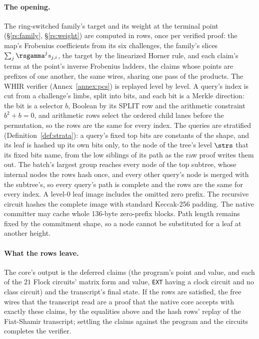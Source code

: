 \paragraph{The opening.} The ring-switched family's target and its weight at the terminal point (\S\ref{rs:family}, \S\ref{rs:weight}) are computed in rows, once per verified proof: the map's Frobenius coefficients from its six challenges, the family's slices $\sum_j\rsgamma^j s_{j,i}$, the target by the linearized Horner rule, and each claim's terms at the point's inverse Frobenius ladders, the claims whose points are prefixes of one another, the same wires, sharing one pass of the products. The WHIR verifier (Annex~\ref{annex:pcs}) is replayed level by level. A query's index is cut from a challenge's limbs, split into bits, and each bit is a Merkle direction: the bit is a selector $b$, Boolean by its \textsf{SPLIT} row and the arithmetic constraint $b^2+b=0$, and arithmetic rows select the ordered child lanes before the permutation, so the rows are the same for every index. The queries are stratified (Definition~\ref{def:strata}): a query's fixed top bits are constants of the shape, and its leaf is hashed up its own bits only, to the node of the tree's level $\strs$ that its fixed bits name, from the low siblings of its path as the raw proof writes them out. The batch's largest group reaches every node of the top subtree, whose internal nodes the rows hash once, and every other query's node is merged with the subtree's, so every query's path is complete and the rows are the same for every index. A level-$0$ leaf image includes the omitted zero prefix. The recursive circuit hashes the complete image with standard Keccak-256 padding. The native committer may cache whole 136-byte zero-prefix blocks. Path length remains fixed by the commitment shape, so a node cannot be substituted for a leaf at another height.

\paragraph{What the rows leave.} The core's output is the deferred claims (the program's point and value, and each of the $21$ Flock circuits' matrix form and value, \texttt{EXT} having a clock circuit and no class circuit) and the transcript's final state. If the rows are satisfied, the free wires that the transcript read are a proof that the native core accepts with exactly these claims, by the equalities above and the hash rows' replay of the Fiat-Shamir transcript; settling the claims against the program and the circuits completes the verifier.

